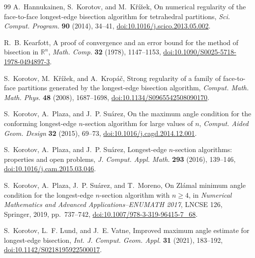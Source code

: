 \documentclass[10pt]{article}
\theoremstyle{definition}
\newcommand{\R}{\mathbb{R}}
\begin{document}
\begin{thebibliography}{99}
A.~Hannukainen, S.~Korotov, and M.~K\v{r}\'i\v{z}ek,
\newblock On numerical regularity of the face-to-face longest-edge bisection algorithm for tetrahedral partitions,
\newblock \emph{Sci. Comput. Program.} \textbf{90} (2014), 34--41,
\newblock \href{https://doi.org/10.1016/j.scico.2013.05.002}{doi:10.1016/j.scico.2013.05.002}.

R.~B. Kearfott,
\newblock A proof of convergence and an error bound for the method of bisection in $\R^n$,
\newblock \emph{Math. Comp.} \textbf{32} (1978), 1147--1153,
\newblock \href{https://doi.org/10.1090/S0025-5718-1978-0494897-3}{doi:10.1090/S0025-5718-1978-0494897-3}.

S.~Korotov, M.~K\v{r}\'i\v{z}ek, and A.~Krop\'a\v{c},
\newblock Strong regularity of a family of face-to-face partitions generated by the longest-edge bisection algorithm,
\newblock \emph{Comput. Math. Math. Phys.} \textbf{48} (2008), 1687--1698,
\newblock \href{https://doi.org/10.1134/S0965542508090170}{doi:10.1134/S0965542508090170}.

S.~Korotov, A.~Plaza, and J.~P. Su\'arez,
\newblock On the maximum angle condition for the conforming longest-edge $n$-section algorithm for large values of $n$,
\newblock \emph{Comput. Aided Geom. Design} \textbf{32} (2015), 69--73,
\newblock \href{https://doi.org/10.1016/j.cagd.2014.12.001}{doi:10.1016/j.cagd.2014.12.001}.

S.~Korotov, A.~Plaza, and J.~P. Su\'arez,
\newblock Longest-edge $n$-section algorithms: properties and open problems,
\newblock \emph{J. Comput. Appl. Math.} \textbf{293} (2016), 139--146,
\newblock \href{https://doi.org/10.1016/j.cam.2015.03.046}{doi:10.1016/j.cam.2015.03.046}.

S.~Korotov, A.~Plaza, J.~P. Su\'arez, and T.~Moreno,
\newblock On Zl\'amal minimum angle condition for the longest-edge $n$-section algorithm with $n\geq4$,
\newblock in \emph{Numerical Mathematics and Advanced Applications--ENUMATH 2017}, LNCSE 126, Springer, 2019, pp.~737--742,
\newblock \href{https://doi.org/10.1007/978-3-319-96415-7_68}{doi:10.1007/978-3-319-96415-7\_68}.

S.~Korotov, L.~F. Lund, and J.~E. Vatne,
\newblock Improved maximum angle estimate for longest-edge bisection,
\newblock \emph{Int. J. Comput. Geom. Appl.} \textbf{31} (2021), 183--192,
\newblock \href{https://doi.org/10.1142/S0218195922500017}{doi:10.1142/S0218195922500017}.


\end{thebibliography}
\end{document}
